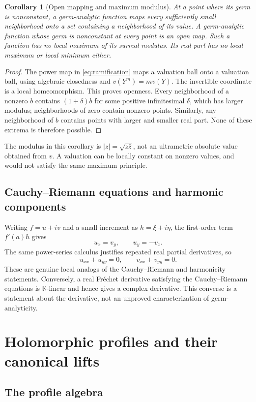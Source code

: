 \documentclass[11pt,a4paper]{article}
\numberwithin{equation}{section}
\newtheorem{corollary}[theorem]{Corollary}
\theoremstyle{definition}
\newcommand{\K}{\mathbb K}
\begin{document}
\begin{corollary}[Open mapping and maximum modulus]\label{cor:openmax}
At a point where its germ is nonconstant, a germ-analytic function maps every
sufficiently small neighborhood onto a set containing a neighborhood of its
value. A germ-analytic function whose germ is nonconstant at every point is
an open map. Such a function has no local maximum of its surreal modulus.
Its real part has no local maximum or local minimum either.
\end{corollary}
\begin{proof}
The power map in \eqref{eq:ramification} maps a valuation ball onto a valuation
ball, using algebraic closedness and $v(Y^m)=mv(Y)$. The invertible coordinate
is a local homeomorphism. This proves openness. Every neighborhood of a
nonzero $b$ contains $(1+\delta)b$ for some positive infinitesimal $\delta$,
which has larger modulus; neighborhoods of zero contain nonzero points.
Similarly, any neighborhood of $b$ contains points with larger and smaller
real part. None of these extrema is therefore possible.
\end{proof}

The modulus in this corollary is $|z|=\sqrt{z\bar z}$, not an ultrametric
absolute value obtained from $v$. A valuation can be locally constant on
nonzero values, and would not satisfy the same maximum principle.

\subsection{Cauchy--Riemann equations and harmonic components}

Writing $f=u+iv$ and a small increment as $h=\xi+i\eta$, the first-order
term $f'(a)h$ gives
\[
 u_x=v_y,\qquad u_y=-v_x.
\]
The same power-series calculus justifies repeated real partial derivatives,
so
\[
 u_{xx}+u_{yy}=0,\qquad v_{xx}+v_{yy}=0.
\]
These are genuine local analogs of the Cauchy--Riemann and harmonicity
statements. Conversely, a real Fr\'echet derivative satisfying the
Cauchy--Riemann equations is $\K$-linear and hence gives a complex derivative.
This converse is a statement about the derivative, not an unproved
characterization of germ-analyticity.

\section{Holomorphic profiles and their canonical lifts}

\subsection{The profile algebra}
\end{document}
